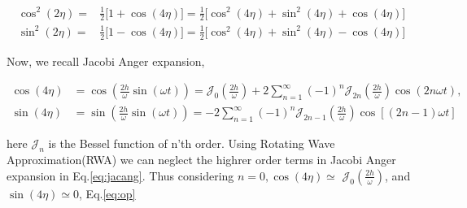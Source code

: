 \documentclass[a4paper,11pt]{article}
\begin{document}
\begin{align}
\cos^2(2\eta) =& \frac12\big[1+\cos(4\eta)\big]=\frac12\big[\cos^2(4\eta)+ \sin^2(4\eta)+\cos(4\eta)\big]\nonumber\\
\sin^2(2\eta) =& \frac12\big[1-\cos(4\eta)\big]=\frac12\big[\cos^2(4\eta)+ \sin^2(4\eta)-\cos(4\eta)\big]
\label{eq:cossin}
\end{align}

Now, we recall Jacobi Anger expansion,


\begin{align}
\cos (4 \eta)&=\cos \left(\frac{2 h}{\omega} \sin (\omega t)\right)=\mathcal{J}_{0}\left(\frac{2 h}{\omega}\right)+2 \sum_{n=1}^{\infty}(-1)^{n} \mathcal{J}_{2 n}\left(\frac{2 h}{\omega}\right) \cos (2 n \omega t), \\
\sin (4 \eta)&=\sin \left(\frac{2 h}{\omega} \sin (\omega t)\right)=-2 \sum_{n=1}^{\infty}(-1)^{n} \mathcal{J}_{2 n-1}\left(\frac{2 h}{\omega}\right) \cos [(2 n-1) \omega t]
\label{eq:jacang}
\end{align}


here $\mathcal{J}_{n}$ is the Bessel function of n'th order. Using Rotating Wave Approximation(RWA) we can neglect the highrer order terms in Jacobi Anger expansion in Eq.\eqref{eq:jacang}. Thus considering $n=0, \cos (4 \eta) \simeq$ $\mathcal{J}_{0}\left(\frac{2 h}{\omega}\right)$, and $\sin (4 \eta) \simeq 0$, Eq.\eqref{eq:op}
\end{document}
